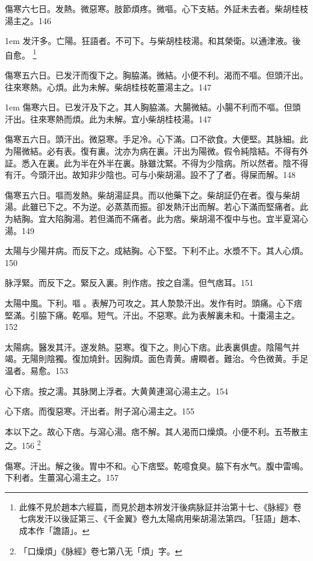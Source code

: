 傷寒六七日。发熱。微惡寒。肢節煩疼。微嘔。心下支結。外証未去者。柴胡桂枝湯主之。146

\hangindent 1em
发汗多。亡陽。狂語者。不可下。与柴胡桂枝湯。和其榮衛。以通津液。後自愈。
	\footnote{
		此條不見於趙本六經篇，而見於趙本辨发汗後病脉証并治第十七、《脉經》卷七病发汗以後証第三、《千金翼》卷九太陽病用柴胡湯法第四。「狂語」趙本、成本作「譫語」。
	}

傷寒五六日。已发汗而復下之。胸脇滿。微結。小便不利。渴而不嘔。但頭汗出。往來寒熱。心煩。此为未解。柴胡桂枝乾薑湯主之。147

\hangindent 1em
傷寒六日。已发汗及下之。其人胸脇滿。大腸微結。小腸不利而不嘔。但頭汗出。往來寒熱而煩。此为未解。宜小柴胡桂枝湯。{\gaoben}147

傷寒五六日。頭汗出。微惡寒。手足冷。心下滿。口不欲食。大便堅。其脉細。此为陽微結。必有表。復有裏。沈亦为病在裏。汗出为陽微。假令純陰結。不得有外証。悉入在裏。此为半在外半在裏。脉雖沈緊。不得为少陰病。所以然者。陰不得有汗。今頭汗出。故知非少陰也。可与{\khaaitp 小}柴胡湯。設不了了者。得屎而解。148

傷寒五六日。嘔而发熱。柴胡湯証具。而以他藥下之。柴胡証仍在者。復与柴胡湯。此雖已下之。不为逆。必蒸蒸而振。卻发熱汗出而解。若心下滿而堅痛者。此为結胸。宜大陷胸湯。若但滿而不痛者。此为痞。柴胡{\khaaitp 湯}不復中与也。宜半夏瀉心湯。149

太陽与少陽并病。而反下之。{\khaaitp 成}結胸。心下堅。下利不止。水漿不下。其人心煩。150

脉浮緊。而反下之。緊反入裏。則作痞。按之自濡。但气痞耳。151

太陽中風。下利。嘔{\sungtpii 𠱘}。表解乃可攻之。其人漐漐汗出。发作有时。頭痛。心下痞堅滿。引脇下痛。乾嘔。短气。汗出。不惡寒。此为表解裏未和。十棗湯主之。152

太陽病。醫发其汗。遂发熱。惡寒。復下之。則心下痞。此表裏俱虗。陰陽气并竭。无陽則陰獨。復加燒針。因胸煩。面色青黄。膚瞤者。難治。今色微黄。手足温者。易愈。153

心下痞。按之濡。其脉関上浮者。大黄{\khaaitp 黄連}瀉心湯主之。154

心下痞。而復惡寒。汗出者。附子瀉心湯主之。155

本以下之。故心下痞。与瀉心湯。痞不解。其人渴而口燥{\khaaitp 煩}。小便不利。五苓散主之。156
	\footnote{
		「口燥煩」《脉經》卷七第八无「煩」字。
	}

傷寒。汗出。解之後。胃中不和。心下痞堅。乾噫食臭。脇下有水气。腹中雷鳴。下利者。生薑瀉心湯主之。157


